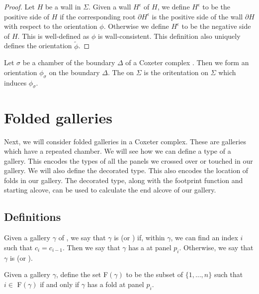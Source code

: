 \documentclass[11pt]{article}
\begin{document}
\begin{proof}
    Let $H$ be a wall in $\Sigma$. Given a wall $H^\epsilon$ of $H$, we define $H^\epsilon$ to be the positive side of $H$ if the corresponding root $\partial H^\epsilon$ is the positive side of the wall $\partial H$ with respect to the orientation $\phi$. Otherwise we define $H^\epsilon$ to be the negative side of $H$. This is well-defined as $\phi$ is wall-consistent. This definition also uniquely defines the orientation $\tilde{\phi}$. 
\end{proof}

\begin{definition}
    Let $\sigma$ be a chamber of the boundary $\Delta$ of a Coxeter complex \sg. Then we form an orientation $\phi_{\sigma}$ on the boundary $\Delta$. The  on $\Sigma$ is the oritentation on $\Sigma$ which induces $\phi_{\sigma}$. 
\end{definition}


\section{Folded galleries}

Next, we will consider folded galleries in a Coxeter complex. These are galleries which have a repeated chamber. We will see how we can define a type of a gallery. This encodes the types of all the panels we crossed over or touched in our gallery. We will also define the decorated type. This also encodes the location of folds in our gallery. The decorated type, along with the footprint function and starting alcove, can be used to calculate the end alcove of our gallery. 

\subsection{Definitions}


\begin{definition}
    Given a gallery $\gamma$ of \sg, we say that $\gamma$ is  (or ) if, within $\gamma$, we can find an index $i$ such that $c_i=c_{i-1}$. Then we say that $\gamma$ has a  at panel $p_i$. Otherwise, we say that $\gamma$ is  (or ).  
\end{definition}

\begin{definition}
    Given a gallery $\gamma$, define the set F$(\gamma)$ to be the subset of $\{1,...,n\}$ such that $i\in$ F$(\gamma)$ if and only if $\gamma$ has a fold at panel $p_i$. 
\end{definition}
\end{document}
